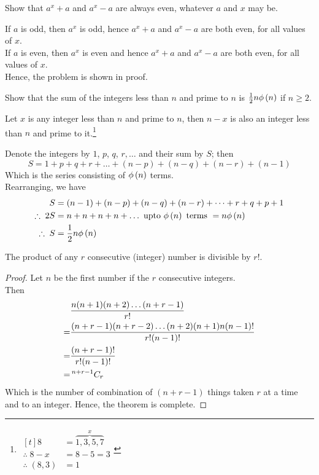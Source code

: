 \documentclass[12pt]{book}
\begin{document}
\begin{qn}[C.H.88 E]
    Show that $ a^x+a $ and $ a^x-a $ are always even, whatever $ a $ and $ x $ may be.
\end{qn}
\begin{soln}
    If $ a $ is odd, then $ a^x $ is odd, hence $ a^x+a $ and $ a^x-a $ are both even, for all values of $ x $.\\
    If $ a $ is even, then $ a^x $ is even and hence $ a^x+a $ and $ a^x-a $ are both even, for all values of $ x $.\\

    Hence, the problem is shown in proof.
\end{soln}
\begin{qn}[I]
    Show that the sum of the integers less than $ n $ and prime to $ n $ is $ \frac{1}{2}n\phi\left( n \right) $ if $ n\geq2 $.
\end{qn}
\begin{soln}
    Let $ x $ is any integer less than $ n $ and prime to $ n $, then $ n-x $ is also an integer less than $ n $ and prime to it.\footnote{$ \begin{aligned}[t]
        8&= \overbrace{1, 3, 5, 7}^{x}\\
        \therefore\; 8-x&=8-5=3\\
        \therefore\; (8,3)&=1
    \end{aligned} $}

    Denote the integers by $ 1 $, $ p $, $ q $, $ r, \dots $ and their sum by $ S $; then
    \[
        S=1+p+q+r+\dots+(n-p)+(n-q)+(n-r)+(n-1)
    \]
    Which is the series consisting of $ \phi\left( n \right) $ terms.\\
    Rearranging, we have
    \begin{align*}
        S&=(n-1)+(n-p)+(n-q)+(n-r)+\dots+r+q+p+1\\
        \therefore\;2S&=n+n+n+n+\dots\text{ upto }\phi\left( n \right) \text{ terms }=n\phi\left( n \right)\\
        \therefore\;S&=\frac{1}{2}n\phi\left( n \right)
    \end{align*}
\end{soln}
\begin{thm}[E]
    The product of any $ r $ consecutive (integer) number is divisible by $ r! $.
\end{thm}
\begin{proof}
    Let $ n $ be the first number if the $ r $ consecutive integers.\\
    Then
    \begin{align*}
        &\frac{n(n+1)(n+2)\dots(n+r-1)}{r!}\\
        =&\frac{(n+r-1)(n+r-2)\dots(n+2)(n+1)n(n-1)!}{r!(n-1)!}\\
        =&\frac{(n+r-1)!}{r!(n-1)!}\\
        =&\,{}^{n+r-1}C_{r}
    \end{align*}
    Which is the number of combination of $ (n+r-1) $ things taken $ r $ at a time and to an integer. Hence, the theorem is complete.
\end{proof}
\end{document}
